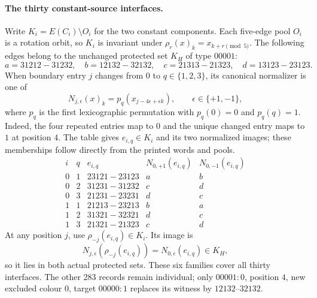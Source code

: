 
\paragraph{The thirty constant-source interfaces.}
Write $K_i=E(C_i)\setminus O_i$ for the two constant components.
Each five-edge pool $O_i$ is a rotation orbit, so $K_i$ is invariant
under $\rho_r(x)_k=x_{k+r\pmod5}$. The following edges belong to
the unchanged protected set $K_H$ of type $00001$:
\[
a=31212\!-31232,\quad b=12132\!-32132,\quad
c=21313\!-21323,\quad d=13123\!-23123.
\]
When boundary entry $j$ changes from $0$ to $q\in\{1,2,3\}$,
its canonical normalizer is one of
\[
 N_{j,\epsilon}(x)_k=p_q(x_{j-4\epsilon+\epsilon k}),
 \qquad \epsilon\in\{+1,-1\},
\]
where $p_q$ is the first lexicographic permutation with $p_q(0)=0$
and $p_q(q)=1$. Indeed, the four repeated entries map to $0$ and
the unique changed entry maps to $1$ at position $4$.
The table gives $e_{i,q}\in K_i$ and its two normalized images;
these memberships follow directly from the printed words and pools.
\[
\begin{array}{cc|c|cc}
i&q&e_{i,q}&N_{0,+1}(e_{i,q})&N_{0,-1}(e_{i,q})\\ \hline
0&1&23121\!-23123&a&b\\
0&2&31231\!-31232&c&d\\
0&3&21231\!-23231&d&c\\
1&1&21213\!-23213&b&a\\
1&2&31321\!-32321&d&c\\
1&3&21321\!-21323&c&d
\end{array}
\]
At any position $j$, use $\rho_{-j}(e_{i,q})\in K_i$. Its image is
\[
 N_{j,\epsilon}(\rho_{-j}(e_{i,q}))
      =N_{0,\epsilon}(e_{i,q})\in K_H,
\]
so it lies in both actual protected sets. These six families cover
all thirty interfaces. The other 283 records remain individual;
only $00001{:}0$, position $4$, new excluded colour $0$, target
$00000{:}1$ replaces its witness by $12132$--$32132$.

